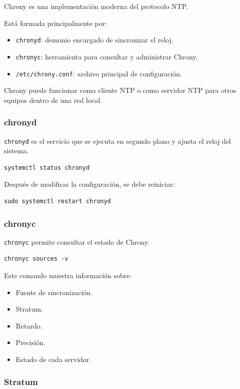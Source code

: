 \documentclass[11pt, letterpaper]{article}
\begin{document}
Chrony es una implementación moderna del protocolo NTP.

Está formada principalmente por:

\begin{itemize}
\item \texttt{chronyd}: demonio encargado de sincronizar el reloj.
\item \texttt{chronyc}: herramienta para consultar y administrar Chrony.
\item \texttt{/etc/chrony.conf}: archivo principal de configuración.
\end{itemize}

Chrony puede funcionar como cliente NTP o como servidor NTP para otros equipos dentro de una red local.
\subsubsection{chronyd}
\label{sec:org70bd664}

\texttt{chronyd} es el servicio que se ejecuta en segundo plano y ajusta el reloj del sistema.

\begin{verbatim}
systemctl status chronyd
\end{verbatim}

Después de modificar la configuración, se debe reiniciar:

\begin{verbatim}
sudo systemctl restart chronyd
\end{verbatim}
\subsubsection{chronyc}
\label{sec:org326c24b}

\texttt{chronyc} permite consultar el estado de Chrony.

\begin{verbatim}
chronyc sources -v
\end{verbatim}

Este comando muestra información sobre:

\begin{itemize}
\item Fuente de sincronización.
\item Stratum.
\item Retardo.
\item Precisión.
\item Estado de cada servidor.
\end{itemize}
\subsubsection{Stratum}
\label{sec:orgf5dd23a}
\end{document}
